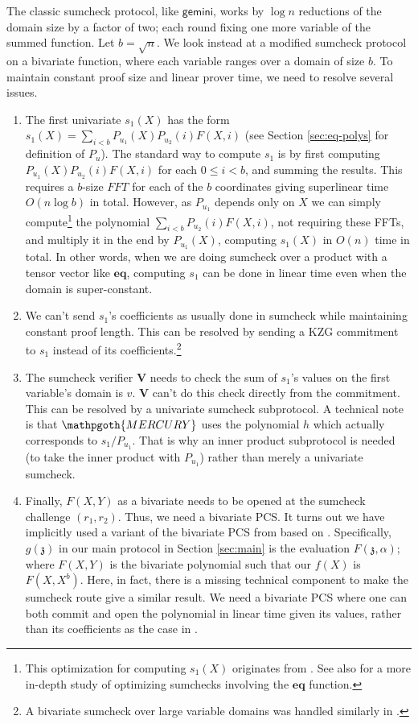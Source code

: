 \documentclass[11pt]{article} %
\newcommand{\gemini}{\ensuremath{\mathsf{gemini}}\xspace}
\newcommand{\mercury}{\ensuremath{\mathpgoth{MERCURY} }\xspace}
\newcommand{\ver}{\ensuremath{\mathsf{\mathbf{V}}}\xspace}
\newcommand{\sumi}[1]{\sum_{i< #1}}
\newcommand{\eq}{\ensuremath{\mathsf{eq}}\xspace}
\renewcommand{\eq}{\ensuremath{\mathbf{eq}}\xspace}
\newcommand{\eqpol}[1]{\ensuremath{P_{#1}}\xspace}
\renewcommand{\zeta}{\mathfrak{z}}
\begin{document}
The classic sumcheck protocol, like \gemini, works by $\log n$ reductions of the domain size by a factor of two; each round fixing one more variable of the summed function. Let $b=\sqrt{n}$. We look instead at a modified sumcheck protocol on a bivariate function, where each variable ranges over a domain of size $b$.
To maintain constant proof size and linear prover time, we need to resolve several issues.
\begin{enumerate}
\item The first univariate $s_1(X)$ has the form $s_1(X)=\sumi{b} \eqpol{u_1}(X)\eqpol{u_2}(i) F(X,i)$ (see Section \ref{sec:eq-polys} for definition of \eqpol{u}). The standard way to compute $s_1$ is by first computing $\eqpol{u_1}(X) \eqpol{u_2}(i) F(X,i)$ for each $0\leq i <b$, and summing the results. This requires a $b$-size $FFT$ for each of the $b$ coordinates giving superlinear time $O(n\log b)$ in total. However, as \eqpol{u_1} depends only on $X$ we can simply compute\footnote{This optimization for computing $s_1(X)$ originates from \cite{gruensumcheck}. See also \cite{thalersumcheck} for a more in-depth study of optimizing sumchecks involving the \eq function.} the polynomial $\sumi{b} \eqpol{u_2}(i)F(X,i)$, not requiring these FFTs, and multiply it in the end by $\eqpol{u_1}(X)$, computing $s_1(X)$ in $O(n)$ time in total. In other words, when we are doing sumcheck over a product with a tensor vector like  \eq, computing $s_1$ can be done in linear time even when the domain is super-constant.
 \item We can't send $s_1$'s coefficients as usually done in sumcheck while maintaining constant proof length. This can be resolved by sending a KZG commitment to $s_1$ instead of its
 coefficients.\footnote{A bivariate sumcheck over large variable domains was handled similarly in \cite{BCGRS}.}
 \item The sumcheck verifier \ver needs to check the sum of $s_1$'s values on the first variable's domain is $v$. \ver can't do this check  directly from the commitment. This can be resolved by a univariate sumcheck subprotocol. A technical note is that \mercury uses the polynomial $h$ which actually corresponds to $s_1/\eqpol{u_1}$. That is why an inner product subprotocol is needed (to take the inner product with \eqpol{u_1}) rather than merely a univariate sumcheck.

\item Finally, $F(X,Y)$ as a bivariate needs to be opened at the sumcheck challenge $(r_1,r_2)$. Thus, we need a bivariate PCS.  It turns out we have implicitly used a variant of the bivariate PCS from \cite{samaritan} based on \cite{caulk}.
Specifically, $g(\zeta)$ in our main protocol in Section \ref{sec:main} is the evaluation 
$F(\zeta,\alpha)$; where $F(X,Y)$ is the bivariate polynomial such that our $f(X)$ is $F(X,X^b)$. Here, in fact, there is a missing technical component to make the sumcheck route give a similar result. We need a bivariate PCS where one can both commit and open the polynomial in linear time given its values, rather than its coefficients as the case in \cite{caulk, samaritan}.
\end{enumerate}
\end{document}
